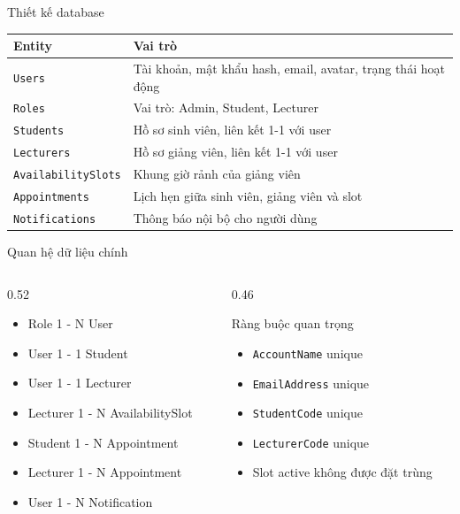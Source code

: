 \documentclass[aspectratio=169,11pt]{beamer}
\begin{document}
\begin{frame}{Thiết kế database}
  \begin{tabular}{p{} p{}}
    \toprule
    \textbf{Entity} & \textbf{Vai trò} \\
    \midrule
    \texttt{Users} & Tài khoản, mật khẩu hash, email, avatar, trạng thái hoạt động \\
    \texttt{Roles} & Vai trò: Admin, Student, Lecturer \\
    \texttt{Students} & Hồ sơ sinh viên, liên kết 1-1 với user \\
    \texttt{Lecturers} & Hồ sơ giảng viên, liên kết 1-1 với user \\
    \texttt{AvailabilitySlots} & Khung giờ rảnh của giảng viên \\
    \texttt{Appointments} & Lịch hẹn giữa sinh viên, giảng viên và slot \\
    \texttt{Notifications} & Thông báo nội bộ cho người dùng \\
    \bottomrule
  \end{tabular}
\end{frame}

\begin{frame}{Quan hệ dữ liệu chính}
  \begin{columns}[T]
    \begin{column}{0.52\textwidth}
      \begin{itemize}
        \item Role 1 - N User
        \item User 1 - 1 Student
        \item User 1 - 1 Lecturer
        \item Lecturer 1 - N AvailabilitySlot
        \item Student 1 - N Appointment
        \item Lecturer 1 - N Appointment
        \item User 1 - N Notification
      \end{itemize}
    \end{column}
    \begin{column}{0.46\textwidth}
      \begin{block}{Ràng buộc quan trọng}
        \begin{itemize}
          \item \texttt{AccountName} unique
          \item \texttt{EmailAddress} unique
          \item \texttt{StudentCode} unique
          \item \texttt{LecturerCode} unique
          \item Slot active không được đặt trùng
        \end{itemize}
      \end{block}
    \end{column}
  \end{columns}
\end{frame}
\end{document}
